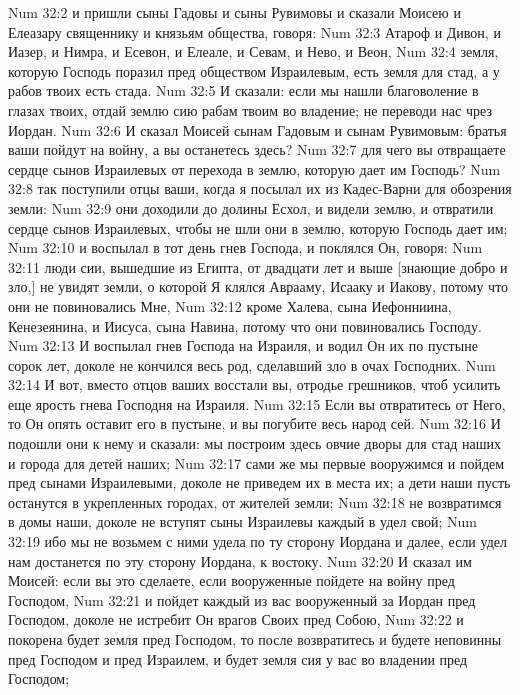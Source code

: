 \vs Num 32:2 и пришли сыны Гадовы и сыны Рувимовы и сказали Моисею и Елеазару священнику и князьям общества, говоря:
\vs Num 32:3 Атароф и Дивон, и Иазер, и Нимра, и Есевон, и Елеале, и Севам, и Нево, и Веон,
\vs Num 32:4 земля, которую Господь поразил пред обществом Израилевым, есть земля  для стад, а у рабов твоих есть стада.
\vs Num 32:5 И сказали: если мы нашли благоволение в глазах твоих, отдай землю сию рабам твоим во владение; не переводи нас чрез Иордан.
\vs Num 32:6 И сказал Моисей сынам Гадовым и сынам Рувимовым: братья ваши пойдут на войну, а вы останетесь здесь?
\vs Num 32:7 для чего вы отвращаете сердце сынов Израилевых от перехода в землю, которую дает им Господь?
\vs Num 32:8 так поступили отцы ваши, когда я посылал их из Кадес-Варни для обозрения земли:
\vs Num 32:9 они доходили до долины Есхол, и видели землю, и отвратили сердце сынов Израилевых, чтобы не шли они в землю, которую Господь дает им;
\vs Num 32:10 и воспылал в тот день гнев Господа, и поклялся Он, говоря:
\vs Num 32:11 люди сии, вышедшие из Египта, от двадцати лет и выше [знающие добро и зло,] не увидят земли, о которой Я клялся Аврааму, Исааку и Иакову, потому что они не повиновались Мне,
\vs Num 32:12 кроме Халева, сына Иефонниина, Кенезеянина, и Иисуса, сына Навина, потому что они повиновались Господу.
\vs Num 32:13 И воспылал гнев Господа на Израиля, и водил Он их по пустыне сорок лет, доколе не кончился весь род, сделавший зло в очах Господних.
\vs Num 32:14 И вот, вместо отцов ваших восстали вы, отродье грешников, чтоб усилить еще ярость гнева Господня на Израиля.
\vs Num 32:15 Если вы отвратитесь от Него, то Он опять оставит его в пустыне, и вы погубите весь народ сей.
\vs Num 32:16 И подошли они к нему и сказали: мы построим здесь овчие дворы для стад наших и города для детей наших;
\vs Num 32:17 сами же мы первые вооружимся и пойдем пред сынами Израилевыми, доколе не приведем их в места их; а дети наши пусть останутся в укрепленных городах,  от жителей земли;
\vs Num 32:18 не возвратимся в домы наши, доколе не вступят сыны Израилевы каждый в удел свой;
\vs Num 32:19 ибо мы не возьмем с ними удела по ту сторону Иордана и далее, если удел нам достанется по эту сторону Иордана, к востоку.
\vs Num 32:20 И сказал им Моисей: если вы это сделаете, если вооруженные пойдете на войну пред Господом,
\vs Num 32:21 и пойдет каждый из вас вооруженный за Иордан пред Господом, доколе не истребит Он врагов Своих пред Собою,
\vs Num 32:22 и покорена будет земля пред Господом, то после возвратитесь и будете неповинны пред Господом и пред Израилем, и будет земля сия у вас во владении пред Господом;
